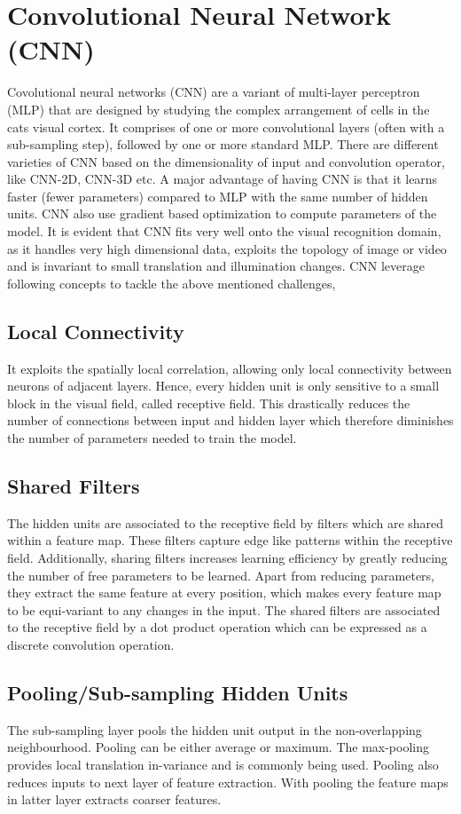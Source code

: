 \section{Convolutional Neural Network (CNN)}
 \label{sec:cnn}
 \par Covolutional neural networks (CNN) are a variant of multi-layer perceptron (MLP) that are designed by studying the complex arrangement of cells in the cats visual cortex.  It comprises of one or more convolutional layers (often with a sub-sampling step), followed by one or more standard MLP.  There are different varieties of CNN based on the dimensionality of input and convolution operator, like CNN-2D, CNN-3D etc.  A major advantage of having CNN is that it learns faster (fewer parameters) compared to MLP with the same number of hidden units.  CNN  also use  gradient based optimization to compute parameters of the model. It is  evident that CNN fits very well onto the visual recognition domain, as it handles very high dimensional data, exploits the topology of image or video and is invariant to small translation and illumination changes.  CNN leverage following concepts to tackle the above mentioned challenges,
\subsection{Local Connectivity}
It exploits the spatially local correlation, allowing only local connectivity between neurons of adjacent layers.  Hence, every hidden unit is only sensitive to a small block in the visual field, called receptive field. This drastically reduces the number of connections between input and hidden layer which therefore diminishes the number of parameters needed to train the model.
\subsection{Shared Filters}
The hidden units are associated to the receptive field by filters which are shared within a feature map. These filters capture edge like patterns within the receptive field.  Additionally, sharing filters increases learning efficiency by greatly reducing the number of free parameters to be learned.  Apart from reducing parameters, they extract the same feature at every position, which makes every feature map to be equi-variant to any changes in the input.  The shared filters are associated to the receptive field by a dot product operation which can be expressed as a discrete convolution operation.
\subsection{Pooling/Sub-sampling Hidden Units}
The sub-sampling layer pools the hidden unit output in the non-overlapping neighbourhood.  Pooling can be either average or maximum.  The max-pooling provides local translation in-variance and is commonly being used.  Pooling also reduces inputs to next layer of feature extraction.  With pooling the feature maps in latter layer extracts coarser features.

